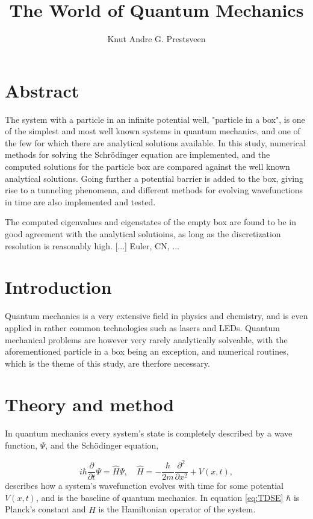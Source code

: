 \documentclass{article}
\title{The World of Quantum Mechanics}
\author{Knut Andre G. Prestsveen}
\begin{document}
\maketitle


\section{Abstract}
The system with a particle in an infinite potential well, "particle in a box", is one of the simplest and most well known systems in quantum mechanics, and one of the few for which there are analytical solutions available. In this study, numerical methods for solving the Schrödinger equation are implemented, and the computed solutions for the particle box are compared against the well known analytical solutions. Going further a potential barrier is added to the box, giving rise to a tunneling phenomena, and different methods for evolving wavefunctions in time are also implemented and tested.

The computed eigenvalues and eigenstates of the empty box are found to be in good agreement with the analytical solutioins, as long as the discretization resolution is reasonably high. [...] Euler, CN, ...

\section{Introduction}
Quantum mechanics is a very extensive field in physics and chemistry, and is even applied in rather common technologies such as lasers and LEDs. Quantum mechanical problems are however very rarely analytically solveable, with the aforementioned particle in a box being an exception, and numerical routines, which is the theme of this study, are therfore necessary.

\section{Theory and method}\label{section:theory}
In quantum mechanics every system's state is completely described by a wave function, $\Psi$, and the Schödinger equation,

\begin{equation}
    i\hbar \frac{\partial}{\partial t} \Psi = \hat{H} \Psi, \quad
    \hat{H} = -\frac{\hbar}{2m} \frac{\partial^2}{\partial x^2} + V(x, t),
    \label{eq:TDSE}
\end{equation}
describes how a system's wavefunction evolves with time for some potential $V(x, t)$, and is the baseline of quantum mechanics. In equation \ref{eq:TDSE} $\hbar$ is Planck's constant and $\hat{H}$ is the Hamiltonian operator of the system.
\end{document}
